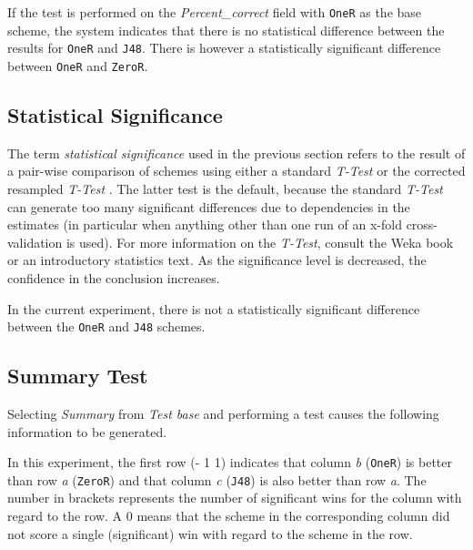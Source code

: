 If the test is performed on the \textit{Percent\_correct} field with \texttt{OneR} as the base scheme, the system indicates that there is no statistical difference between the results for \texttt{OneR} and \texttt{J48}. There is however a statistically significant difference between \texttt{OneR} and \texttt{ZeroR}.
\begin{center}
\end{center}


\subsection{Statistical Significance}

The term \textit{statistical significance} used in the previous section refers to the result of a pair-wise comparison of schemes using either a standard \textit{T-Test} or the corrected resampled \textit{T-Test} \cite{bengio}. The latter test is the default, because the standard \textit{T-Test} can generate too many significant differences due to dependencies in the estimates (in particular when anything other than one run of an x-fold cross-validation is used). For more information on the \textit{T-Test}, consult the Weka book \cite{witten} or an introductory statistics text. As the significance level is decreased, the confidence in the conclusion increases.

In the current experiment, there is not a statistically significant difference between the \texttt{OneR} and \texttt{J48} schemes.


\subsection{Summary Test}

Selecting \textit{Summary} from \textit{Test base} and performing a test causes the following information to be generated.
\begin{center}
\end{center}

In this experiment, the first row (- 1 1) indicates that column \textit{b} (\texttt{OneR}) is better than row \textit{a} (\texttt{ZeroR}) and that column \textit{c} (\texttt{J48}) is also better than row \textit{a}. The number in brackets represents the number of significant wins for the column with regard to the row. A $0$ means that the scheme in the corresponding column did not score a single (significant) win with regard to the scheme in the row.


